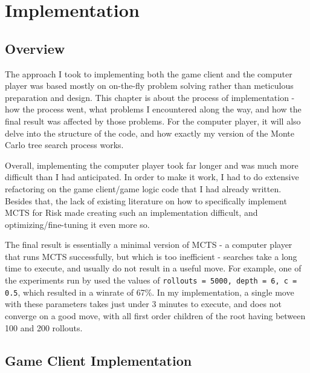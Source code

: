 \graphicspath{ {./Images/} }
\chapter{Implementation}
\label{implementation}
\section{Overview}
\label{implementationOverview}

The approach I took to implementing both the game client and the computer player was based mostly on on-the-fly problem solving rather than meticulous preparation and design. This chapter is about the process of implementation - how the process went, what problems I encountered along the way, and how the final result was affected by those problems. For the computer player, it will also delve into the structure of the code, and how exactly my version of the Monte Carlo tree search process works.

Overall, implementing the computer player took far longer and was much more difficult than I had anticipated. In order to make it work, I had to do extensive refactoring on the game client/game logic code that I had already written. Besides that, the lack of existing literature on how to specifically implement MCTS for Risk made creating such an implementation difficult, and optimizing/fine-tuning it even more so.

The final result is essentially a minimal version of MCTS - a computer player that runs MCTS successfully, but which is too inefficient - searches take a long time to execute, and usually do not result in a useful move. For example, one of the experiments run by \cite{limer2020monte} used the values of \texttt{rollouts = 5000, depth = 6, c = 0.5}, which resulted in a winrate of 67\%. In my implementation, a single move with these parameters takes just under 3 minutes to execute, and does not converge on a good move, with all first order children of the root having between 100 and 200 rollouts.

\section{Game Client Implementation}
\label{gameClientImplementation}
